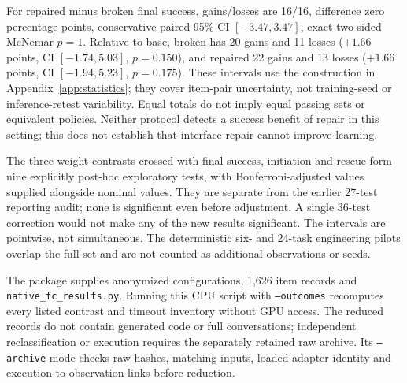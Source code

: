 For repaired minus broken final success, gains/losses are 16/16, difference zero
percentage points, conservative paired 95\% CI $[-3.47,3.47]$, exact two-sided
McNemar $p=1$. Relative to base, broken has 20 gains and 11 losses
($+1.66$ points, CI $[-1.74,5.03]$, $p=0.150$), and repaired 22 gains and 13 losses
($+1.66$ points, CI $[-1.94,5.23]$, $p=0.175$). These intervals use the construction
in Appendix~\ref{app:statistics}; they cover item-pair uncertainty, not training-seed
or inference-retest variability. Equal totals do not imply equal passing sets or
equivalent policies. Neither protocol detects a success benefit of repair in this
setting; this does not establish that interface repair cannot improve learning.

The three weight contrasts crossed with final success, initiation and rescue form
nine explicitly post-hoc exploratory tests, with Bonferroni-adjusted values supplied
alongside nominal values. They are separate from the earlier 27-test reporting
audit; none is significant even before adjustment. A single 36-test correction
would not make any of the new results significant. The intervals are pointwise,
not simultaneous. The deterministic six- and 24-task engineering pilots overlap
the full set and are not counted as additional observations or seeds.

The package supplies anonymized configurations, 1,626 item records and
\texttt{native\_\allowbreak fc\_\allowbreak results.py}. Running this CPU script with \texttt{--outcomes}
recomputes every listed contrast and timeout inventory without GPU access.
The reduced records do not contain generated code or full conversations;
independent reclassification or execution requires the separately retained raw
archive. Its \texttt{--archive} mode checks raw hashes, matching inputs,
loaded adapter identity and execution-to-observation links before reduction.

